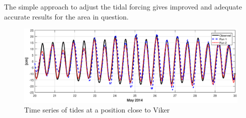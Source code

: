 The simple approach to adjust the tidal forcing gives improved and adequate accurate results for the area in question. 



\begin{figure}[!t]
\centering
\includegraphics[width=\textwidth]{fig_Viker_timeseries}
\caption{Time series of tides at a position close to Viker}
\label{fig:Viker_timeseries}
\end{figure}



